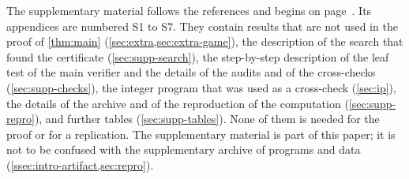 The supplementary material follows the references and begins on page~\pageref{part:supp}. Its
appendices are numbered S1 to S7. They contain results that are not used in the proof of
\cref{thm:main} (\cref{sec:extra,sec:extra-game}), the description of the search that found the
certificate (\cref{sec:supp-search}), the step-by-step description of the leaf test of the main verifier
and the details of the audits and of the cross-checks (\cref{sec:supp-checks}), the integer program that
was used as a cross-check (\cref{sec:ip}), the details of the archive and of the reproduction of the
computation (\cref{sec:supp-repro}), and further tables (\cref{sec:supp-tables}). None of them is needed
for the proof or for a replication. The supplementary material is part of this paper; it is not to be
confused with the supplementary archive of programs and data (\cref{ssec:intro-artifact,sec:repro}).
